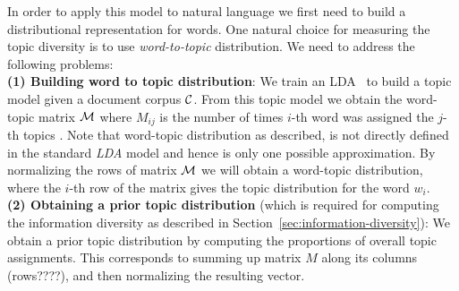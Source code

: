 \documentclass{article} %
\begin{document}
In order to apply this model to natural language we first need to build a distributional representation for words. One
natural choice for measuring the topic diversity is to use {\sl word-to-topic} distribution. We need to address the following problems:\\
{\bf (1) Building word to topic distribution}: We train an
LDA~\cite{Blei:2003:LDA:944919.944937} to build a topic model given a document corpus ${\mathcal C}$. From this topic model we obtain the
word-topic matrix ${\mathcal M}$ where $M_{ij}$ is the number of times $i$-th word was assigned the $j$-th topics . Note that word-topic distribution as described, is not directly defined in the standard {\em LDA} model and hence is only one possible approximation. By normalizing the rows of matrix ${\mathcal M}$ we will obtain
a word-topic distribution, where the $i$-th row of the matrix gives the topic distribution for the word $w_i$.\\
{\bf (2) Obtaining a prior topic distribution} (which is
required for computing the information diversity as described in Section~\ref{sec:information-diversity}): We obtain a prior
 topic distribution by computing the proportions of overall topic
 assignments. This corresponds to summing up matrix $M$ along its
 columns (rows????), and then normalizing the resulting vector.\\

\end{document}
